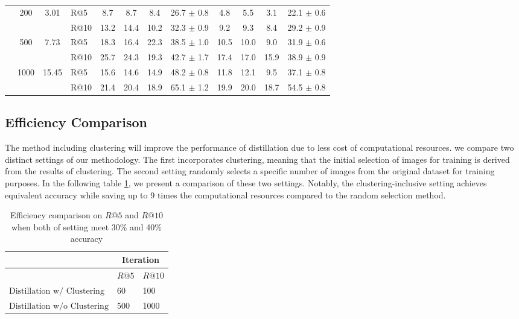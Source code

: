 \documentclass[sigconf, nonacm]{acmart}
\begin{document}
\begin{table*}[!h]
\begin{tabular}{lccl|ccc|c|ccc|c}
                              & \multirow{2}{*}{200} & \multirow{2}{*}{3.01} & R@5 & 8.7 & 8.7 & 8.4 & 26.7 $\pm$ 0.8 & 4.8 & 5.5 & 3.1 & 22.1 $\pm$ 0.6 \\
                              & & & R@10 & 13.2 & 14.4 & 10.2  & 32.3 $\pm$ 0.9 & 9.2 & 9.3 & 8.4 & 29.2 $\pm$ 0.9 \\
                              & \multirow{2}{*}{500} & \multirow{2}{*}{7.73} & R@5 & 18.3 & 16.4 & 22.3 & 38.5 $\pm$ 1.0 & 10.5 & 10.0 & 9.0 & 31.9 $\pm$ 0.6 \\
                              & & & R@10 & 25.7 & 24.3 & 19.3  & 42.7 $\pm$ 1.7 & 17.4 & 17.0 & 15.9 & 38.9 $\pm$ 0.9 \\
                              & \multirow{2}{*}{1000} & \multirow{2}{*}{15.45} & R@5 & 15.6 & 14.6 & 14.9 & 48.2 $\pm$ 0.8 & 11.8 & 12.1 & 9.5 & 37.1 $\pm$ 0.8 \\
                              & & & R@10 & 21.4 & 20.4 & 18.9  & 65.1 $\pm$ 1.2 & 19.9 & 20.0 & 18.7 & 54.5 $\pm$ 0.8 \\
  \bottomrule
\end{tabular}
\end{table*}

\subsection{Efficiency Comparison}
The method including clustering will improve the performance of distillation due to less cost of computational resources. we compare two distinct settings of our methodology. The first incorporates clustering, meaning that the initial selection of images for training is derived from the results of clustering. The second setting randomly selects a specific number of images from the original dataset for training purposes. In the following table \ref{tab_efficiency}, we present a comparison of these two settings. Notably, the clustering-inclusive setting achieves equivalent accuracy while saving up to 9 times the computational resources compared to the random selection method. 
\begin{table}[!h]
    \centering
    \caption{Efficiency comparison on \( R@5 \) and \( R@10 \) when both of setting meet 30\% and 40\% accuracy}
    \label{tab_efficiency}
    \begin{tabular}{l|l|l}
    \toprule
        ~ & \multicolumn{2}{c}{Iteration} \\ \midrule
        ~ & \( R@5 \) & \( R@10 \) \\ \midrule
        \( \text{Distillation w/ Clustering} \) & 60 & 100\\ \midrule
        \( \text{Distillation w/o Clustering} \) & 500 & 1000\\ \midrule
    \end{tabular}
\end{table}
\end{document}
